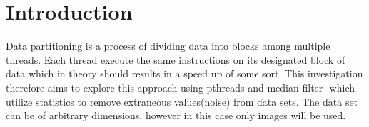 \section{Introduction}
Data partitioning is a process of dividing data into blocks among multiple threads. Each thread execute the same instructions on its designated block of data which in theory should results in a speed up of some sort. This investigation therefore aims to explore this approach using pthreads and median filter- which utilize statistics to remove extraneous values(noise) from data sets. The data set can be of arbitrary dimensions, however in this case only images will be used.

